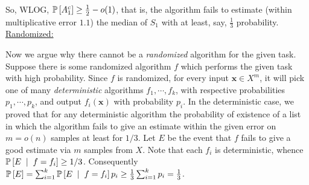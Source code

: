 \begin{enumerate}[leftmargin = *, label=(\alph*)]
So, WLOG, $\P{A_{1}^{c}} \ge \frac{1}{2} - o(1)$, that is, the algorithm fails to estimate (within multiplicative error $1.1$) the median of $S_{1}$ with at least, say, $\frac{1}{3}$ probability.\\
 
\underline{Randomized:}

Now we argue why there cannot be a \textit{randomized} algorithm for the given task. Suppose there is some randomized algorithm $f$ which performs the given task with high probability. Since $f$ is randomized, for every input $\pmb x\in X^{m}$, it will pick one of many \textit{deterministic} algorithms $f_{1},\cdots,f_{k}$, with respective probabilities $p_{1},\cdots, p_{k}$, and output $f_{i}(\pmb x)$ with probability $p_{i}$. In the deterministic case, we proved that for any deterministic algorithm the probability of existence of a list in which the algorithm fails to give an estimate within the given error on $m=o(n)$ samples at least for $1/3$. Let $E$ be the event that $f$ fails to give a good estimate via $m$ samples from $X$. Note that each $f_{i}$ is deterministic, whence $\P{E\st f=f_{i}} \ge1/3$. Consequently $\P{E} = \sum_{i=1}^{k}\P{E\st f=f_{i}}p_{i} \ge \frac{1}{3}\sum_{i=1}^{k}p_{i} = \frac13$.


 

\end{enumerate}
